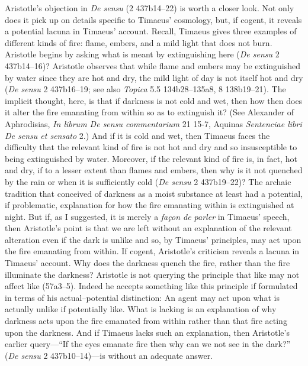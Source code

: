 Aristotle's objection in \emph{De sensu} (2 437b14–22) is worth a closer look. Not only does it pick up on details specific to Timaeus' cosmology, but, if cogent, it reveals a potential lacuna in Timaeus' account. Recall, Timaeus gives three examples of different kinds of fire: flame, embers, and a mild light that does not burn. Aristotle begins by asking what is meant by extinguishing here (\emph{De sensu} 2 437b14--16)? Aristotle observes that while flame and embers may be extinguished by water since they are hot and dry, the mild light of day is not itself hot and dry (\emph{De sensu} 2 437b16--19; see also \emph{Topica} 5.5 134b28--135a8, 8 138b19--21). The implicit thought, here, is that if darkness is not cold and wet, then how then does it alter the fire emanating from within so as to extinguish it? (See Alexander of Aphrodisias, \emph{In librum De sensu commentarium} 21 15-7, Aquinas \emph{Sentenciae libri De sensu et sensato} 2.) And if it is cold and wet, then Timaeus faces the difficulty that the relevant kind of fire is not hot and dry and so insusceptible to being extinguished by water. Moreover, if the relevant kind of fire is, in fact, hot and dry, if to a lesser extent than flames and embers, then why is it not quenched by the rain or when it is sufficiently cold (\emph{De sensu} 2 437b19--22)? The archaic tradition that conceived of darkness as a moist substance at least had a potential, if problematic, explanation for how the fire emanating within is extinguished at night. But if, as I suggested, it is merely a \emph{façon de parler} in Timaeus' speech, then Aristotle's point is that we are left without an explanation of the relevant alteration even if the dark is unlike and so, by Timaeus' principles, may act upon the fire emanating from within. If cogent, Aristotle's criticism reveals a lacuna in Timaeus' account. Why does the darkness quench the fire, rather than the fire illuminate the darkness? Aristotle is not querying the principle that like may not affect like (57a3–5). Indeed he accepts something like this principle if formulated in terms of his actual--potential distinction: An agent may act upon what is actually unlike if potentially like. What is lacking is an explanation of why darkness acts upon the fire emanated from within rather than that fire acting upon the darkness. And if Timaeus lacks such an explanation, then Aristotle's earlier query---``If the eyes emanate fire then why can we not see in the dark?'' (\emph{De sensu} 2 437b10--14)---is without an adequate answer.


